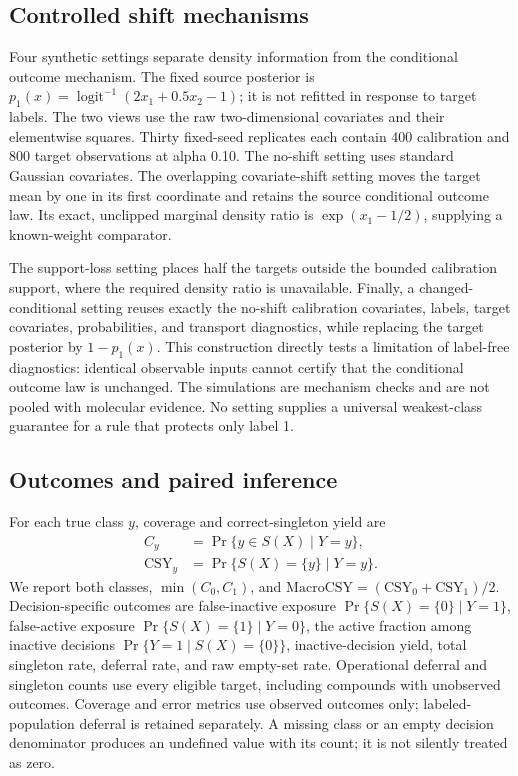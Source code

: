 \documentclass[11pt]{article}
\begin{document}
\subsection{Controlled shift mechanisms}
Four synthetic settings separate density information from the conditional outcome mechanism. The fixed source posterior is $p_1(x)=\operatorname{logit}^{-1}(2x_1+0.5x_2-1)$; it is not refitted in response to target labels. The two views use the raw two-dimensional covariates and their elementwise squares. Thirty fixed-seed replicates each contain 400 calibration and 800 target observations at alpha 0.10. The no-shift setting uses standard Gaussian covariates. The overlapping covariate-shift setting moves the target mean by one in its first coordinate and retains the source conditional outcome law. Its exact, unclipped marginal density ratio is $\exp(x_1-1/2)$, supplying a known-weight comparator.

The support-loss setting places half the targets outside the bounded calibration support, where the required density ratio is unavailable. Finally, a changed-conditional setting reuses exactly the no-shift calibration covariates, labels, target covariates, probabilities, and transport diagnostics, while replacing the target posterior by $1-p_1(x)$. This construction directly tests a limitation of label-free diagnostics: identical observable inputs cannot certify that the conditional outcome law is unchanged. The simulations are mechanism checks and are not pooled with molecular evidence. No setting supplies a universal weakest-class guarantee for a rule that protects only label 1.

\subsection{Outcomes and paired inference}
For each true class $y$, coverage and correct-singleton yield are
\begin{align}
 C_y&=\Pr\{y\in S(X)\mid Y=y\},\\
 \mathrm{CSY}_y&=\Pr\{S(X)=\{y\}\mid Y=y\}.
\end{align}
We report both classes, $\min(C_0,C_1)$, and $\mathrm{MacroCSY}=(\mathrm{CSY}_0+\mathrm{CSY}_1)/2$. Decision-specific outcomes are false-inactive exposure $\Pr\{S(X)=\{0\}\mid Y=1\}$, false-active exposure $\Pr\{S(X)=\{1\}\mid Y=0\}$, the active fraction among inactive decisions $\Pr\{Y=1\mid S(X)=\{0\}\}$, inactive-decision yield, total singleton rate, deferral rate, and raw empty-set rate. Operational deferral and singleton counts use every eligible target, including compounds with unobserved outcomes. Coverage and error metrics use observed outcomes only; labeled-population deferral is retained separately. A missing class or an empty decision denominator produces an undefined value with its count; it is not silently treated as zero.
\end{document}
